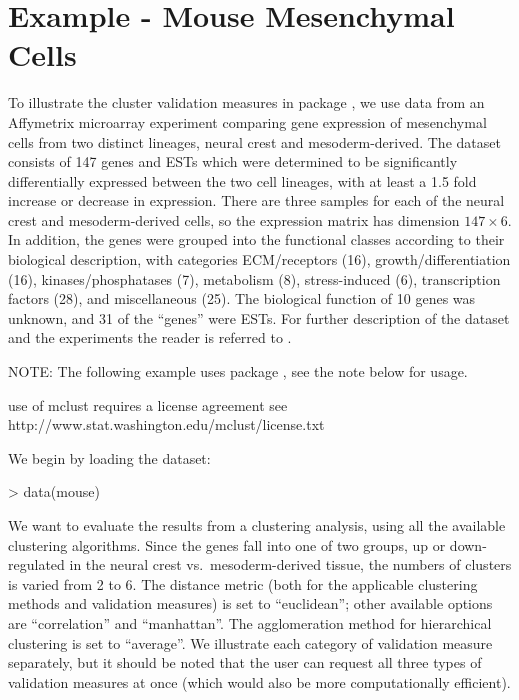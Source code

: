 \documentclass[11pt]{article}
\begin{document}




\section{Example - Mouse Mesenchymal Cells}
\label{sec:illustration}

To illustrate the cluster validation measures in package
, we use data from an Affymetrix microarray experiment
comparing gene expression of mesenchymal cells from two distinct
lineages, neural crest and mesoderm-derived.  The dataset consists of
147 genes and ESTs which were determined to
be significantly differentially expressed between the two cell lineages,
with at least a 1.5 fold increase or decrease in expression.  There
are three samples for each of the neural crest and mesoderm-derived
cells, so the expression matrix has dimension $147\times 6$.  In
addition, the genes were grouped into the functional classes according
to their biological description, with categories ECM/receptors (16),
growth/differentiation (16), kinases/phosphatases (7), metabolism (8),
stress-induced (6), transcription factors (28), and miscellaneous
(25).  The biological function of 10 genes was unknown, and 31 of the
``genes'' were ESTs.
For further description of the dataset and the experiments the reader is referred to \citet{Bha2007}.

NOTE: The following example uses package , see the note
below for usage.

\begin{Schunk}
\begin{Soutput}
use of mclust requires a license agreement
see http://www.stat.washington.edu/mclust/license.txt
\end{Soutput}
\end{Schunk}

We begin by loading the dataset:
\begin{Schunk}
\begin{Sinput}
> data(mouse)
\end{Sinput}
\end{Schunk}
We want to evaluate the results from a clustering analysis, using all the
available clustering algorithms.   Since the genes fall
into one of two groups, up or down-regulated in the neural
crest vs.~mesoderm-derived tissue, the numbers of clusters is varied
from 2 to 6.  The distance metric (both for the applicable
clustering methods and validation measures) is set to ``euclidean''; other available options are
``correlation'' and ``manhattan''.  The agglomeration method for
hierarchical clustering is set to ``average''.  
We illustrate each category of validation measure separately, but it
should be noted that the user can request all three types of
validation measures at once (which would also be more computationally efficient).
\end{document}
